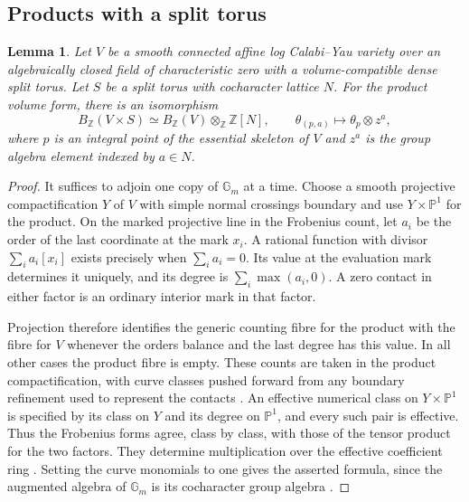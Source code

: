 \documentclass[11pt,reqno]{amsart}
\numberwithin{equation}{section}
\newtheorem{lemma}[theorem]{Lemma}
\theoremstyle{definition}
\theoremstyle{remark}
\begin{document}
\subsection{Products with a split torus}

\begin{lemma}\label{lem:intrinsic-torus-product}
Let \(V\) be a smooth connected affine log Calabi--Yau variety over an
algebraically closed field of characteristic zero with a volume-compatible
dense split torus. Let \(S\) be a split torus with cocharacter lattice \(N\).
For the product volume form, there is an isomorphism
\[ B_{\mathbb Z}(V\times S)\simeq B_{\mathbb Z}(V)\otimes_{\mathbb Z}\mathbb Z[N],\qquad \theta_{(p,a)}\longmapsto\theta_p\otimes z^a, \]
where \(p\) is an integral point of the essential skeleton of \(V\) and
\(z^a\) is the group algebra element indexed by \(a\in N\).
\end{lemma}
\begin{proof}
It suffices to adjoin one copy of \(\mathbb G_m\) at a time. Choose a
smooth projective compactification \(Y\) of \(V\) with simple normal
crossings boundary and use \(Y\times\mathbb P^1\) for the product.
On the marked projective line in the Frobenius count, let \(a_i\) be
the order of the last coordinate at the mark \(x_i\). A rational
function with divisor \(\sum_i a_i[x_i]\) exists precisely when
\(\sum_i a_i=0\). Its value at the evaluation mark determines it
uniquely, and its degree is \(\sum_i\max(a_i,0)\). A zero contact
in either factor is an ordinary interior mark in that factor.

Projection therefore identifies the generic counting fibre for the
product with the fibre for \(V\) whenever the orders balance and the
last degree has this value. In all other cases the product fibre is empty.
These counts are taken in the product compactification, with curve
classes pushed forward from any boundary refinement used to represent
the contacts \cite[Proposition~17.3(1)]{KY}. An effective numerical
class on \(Y\times\mathbb P^1\) is specified by its class on \(Y\) and
its degree on \(\mathbb P^1\), and every such pair is effective.
Thus the Frobenius forms agree, class by class, with those of the
tensor product for the two factors. They determine multiplication
over the effective coefficient ring \cite[Theorem~1.2]{KY}.
Setting the curve monomials to one gives the asserted formula, since
the augmented algebra of \(\mathbb G_m\) is its cocharacter group
algebra \cite[Lemma~9.4]{KY}.
\end{proof}
\end{document}
